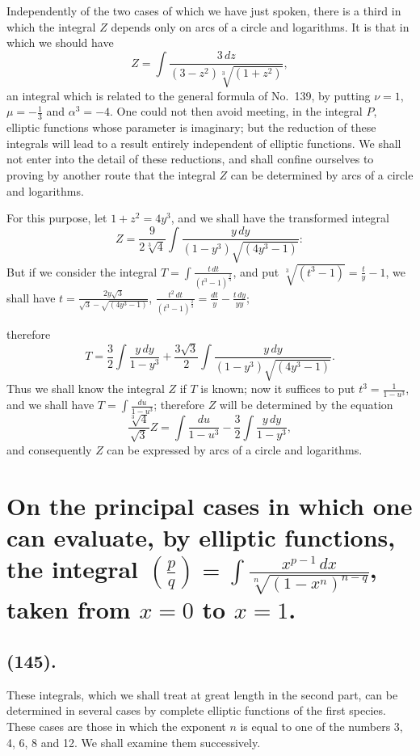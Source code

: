 \documentclass{article}
\begin{document}
Independently of the two cases of which we have just spoken, there is a third in which the integral $Z$ depends only on arcs of a circle and logarithms. It is that in which we should have
\[ Z=\int\frac{3\,dz}{(3-z^{2})\sqrt[3]{(1+z^{2})}}, \]
an integral which is related to the general formula of No.~139, by putting $\nu=1$, $\mu=-\frac{1}{3}$ and $\alpha^{3}=-4$. One could not then avoid meeting, in the integral $P$, elliptic functions whose parameter is imaginary; but the reduction of these integrals will lead to a result entirely independent of elliptic functions. We shall not enter into the detail of these reductions, and shall confine ourselves to proving by another route that the integral $Z$ can be determined by arcs of a circle and logarithms.

For this purpose, let $1+z^{2}=4y^{3}$, and we shall have the transformed integral
\[ Z=\frac{9}{2\sqrt[3]{4}}\int\frac{y\,dy}{(1-y^{3})\sqrt{(4y^{3}-1)}}: \]
But if we consider the integral $T=\displaystyle\int\frac{t\,dt}{(t^{3}-1)^{\frac{2}{3}}}$, and put $\sqrt[3]{(t^{3}-1)}=\frac{t}{y}-1$, we shall have $t=\frac{2y\sqrt{3}}{\sqrt{3}-\sqrt{(4y^{3}-1)}}$, $\frac{t^{2}\,dt}{(t^{3}-1)^{\frac{2}{3}}}=\frac{dt}{y}-\frac{t\,dy}{yy}$;

therefore
\[ T=\frac{3}{2}\int\frac{y\,dy}{1-y^{3}}+\frac{3\sqrt{3}}{2}\int\frac{y\,dy}{(1-y^{3})\sqrt{(4y^{3}-1)}}. \]
Thus we shall know the integral $Z$ if $T$ is known; now it suffices to put $t^{3}=\frac{1}{1-u^{3}}$, and we shall have $T=\displaystyle\int\frac{du}{1-u^{3}}$; therefore $Z$ will be determined by the equation
\[ \frac{\sqrt[3]{4}}{\sqrt{3}}Z=\int\frac{du}{1-u^{3}}-\frac{3}{2}\int\frac{y\,dy}{1-y^{3}}, \]
and consequently $Z$ can be expressed by arcs of a circle and logarithms.

\section*{On the principal cases in which one can evaluate, by elliptic functions, the integral $\left(\frac{p}{q}\right)=\displaystyle\int\frac{x^{p-1}\,dx}{\sqrt[n]{(1-x^{n})^{n-q}}}$, taken from $x=0$ to $x=1$.}

\subsection*{(145).}

These integrals, which we shall treat at great length in the second part, can be determined in several cases by complete elliptic functions of the first species. These cases are those in which the exponent $n$ is equal to one of the numbers 3, 4, 6, 8 and 12. We shall examine them successively.
\end{document}
